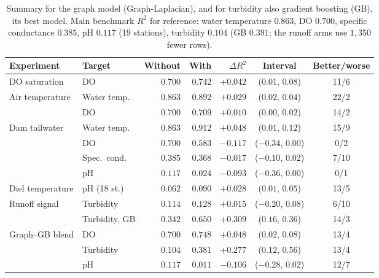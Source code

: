 \documentclass[11pt]{article}
\begin{document}
\begin{table}[h]
\centering
\small
\caption{Summary for the graph model (Graph-Laplacian), and for turbidity also gradient boosting
(GB), its best model. Main benchmark $R^2$ for reference: water temperature $0.863$, DO $0.700$,
specific conductance $0.385$, pH $0.117$ (19 stations), turbidity $0.104$ (GB $0.391$; the
runoff arms use $1{,}350$ fewer rows).}
\label{tab:summary}
\begin{tabular}{l l rrrcc}
\toprule
Experiment & Target & Without & With & $\Delta R^2$ & Interval & Better/worse \\
\midrule
DO saturation    & DO          & $0.700$ & $0.742$ & $\mathbf{+0.042}$ & ($0.01$, $0.08$) & 11/6 \\
Air temperature  & Water temp. & $0.863$ & $0.892$ & $\mathbf{+0.029}$ & ($0.02$, $0.04$) & 22/2 \\
                 & DO          & $0.700$ & $0.709$ & $\mathbf{+0.010}$ & ($0.00$, $0.02$) & 14/2 \\
Dam tailwater    & Water temp. & $0.863$ & $0.912$ & $\mathbf{+0.048}$ & ($0.01$, $0.12$) & 15/9 \\
                 & DO          & $0.700$ & $0.583$ & $-0.117$ & ($-0.34$, $0.00$) & 0/2 \\
                 & Spec.\ cond.& $0.385$ & $0.368$ & $-0.017$ & ($-0.10$, $0.02$) & 7/10 \\
                 & pH          & $0.117$ & $0.024$ & $-0.093$ & ($-0.36$, $0.00$) & 0/1 \\
Diel temperature & pH (18 st.) & $0.062$ & $0.090$ & $\mathbf{+0.028}$ & ($0.01$, $0.05$) & 13/5 \\
Runoff signal    & Turbidity   & $0.114$ & $0.128$ & $+0.015$ & ($-0.20$, $0.08$) & 6/10 \\
                 & Turbidity, GB & $0.342$ & $0.650$ & $\mathbf{+0.309}$ & ($0.16$, $0.36$) & 14/3 \\
Graph--GB blend  & DO          & $0.700$ & $0.748$ & $\mathbf{+0.048}$ & ($0.02$, $0.08$) & 13/4 \\
                 & Turbidity   & $0.104$ & $0.381$ & $\mathbf{+0.277}$ & ($0.12$, $0.56$) & 13/4 \\
                 & pH          & $0.117$ & $0.011$ & $-0.106$ & ($-0.28$, $0.02$) & 12/7 \\
\bottomrule
\end{tabular}
\end{table}

\end{document}
